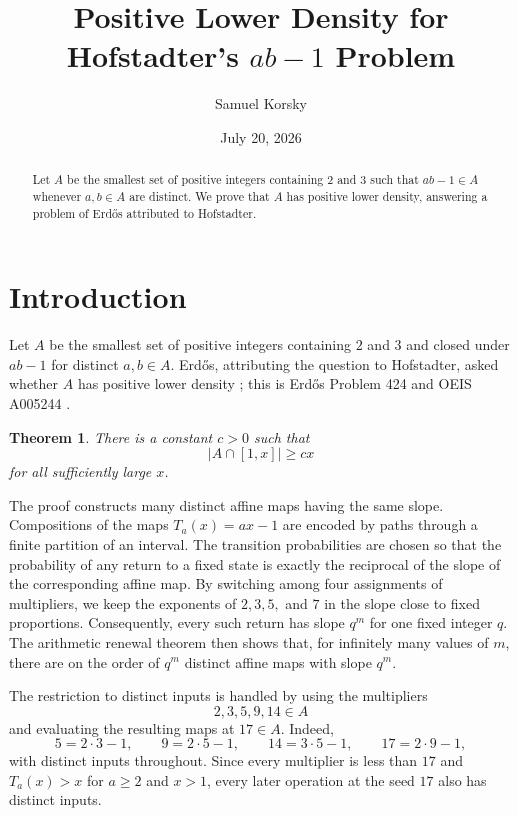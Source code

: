 \documentclass[11pt]{article}
\title{Positive Lower Density for Hofstadter's $ab-1$ Problem}
\author{Samuel Korsky}
\date{July 20, 2026}
\newtheorem{theorem}{Theorem}
\begin{document}
\maketitle

\begin{abstract}
\noindent
Let $A$ be the smallest set of positive integers containing $2$ and $3$ such that $ab-1\in A$ whenever $a,b\in A$ are distinct. We prove that $A$ has positive lower density, answering a problem of Erd\H{o}s attributed to Hofstadter.
\end{abstract}

\section{Introduction}

Let $A$ be the smallest set of positive integers containing $2$ and $3$ and closed under $ab-1$ for distinct $a,b\in A$. Erd\H{o}s, attributing the question to Hofstadter, asked whether $A$ has positive lower density \cite{Erdos1977,ErdosGraham1980}; this is Erd\H{o}s Problem 424 and OEIS A005244 \cite{Bloom424,OEISoriginal}.

\begin{theorem}\label{thm:main}
There is a constant $c>0$ such that
\[
|A\cap[1,x]|\geq cx
\]
for all sufficiently large $x$.
\end{theorem}

The proof constructs many distinct affine maps having the same slope. Compositions of the maps $T_a(x)=ax-1$ are encoded by paths through a finite partition of an interval. The transition probabilities are chosen so that the probability of any return to a fixed state is exactly the reciprocal of the slope of the corresponding affine map. By switching among four assignments of multipliers, we keep the exponents of $2,3,5,$ and $7$ in the slope close to fixed proportions. Consequently, every such return has slope $q^m$ for one fixed integer $q$. The arithmetic renewal theorem then shows that, for infinitely many values of $m$, there are on the order of $q^m$ distinct affine maps with slope $q^m$.

The restriction to distinct inputs is handled by using the multipliers
\[
2,3,5,9,14\in A
\]
and evaluating the resulting maps at $17\in A$. Indeed,
\[
5=2\cdot3-1,\qquad 9=2\cdot5-1,\qquad
14=3\cdot5-1,\qquad 17=2\cdot9-1,
\]
with distinct inputs throughout. Since every multiplier is less than $17$ and $T_a(x)>x$ for $a\geq2$ and $x>1$, every later operation at the seed $17$ also has distinct inputs.
\end{document}
